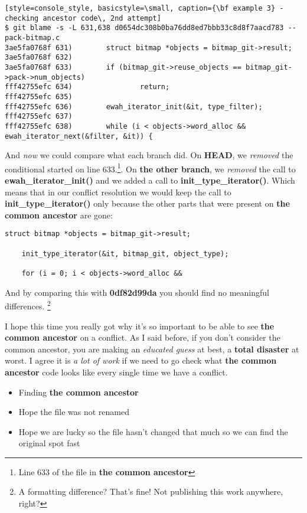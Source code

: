 \begin{lstlisting}[style=console_style, basicstyle=\small, caption={\bf example 3} - checking ancestor code\, 2nd attempt]
$ git blame -s -L 631,638 d0654dc308b0ba76dd8ed7bbb33c8d8f7aacd783 -- pack-bitmap.c
3ae5fa0768f 631)        struct bitmap *objects = bitmap_git->result;
3ae5fa0768f 632) 
3ae5fa0768f 633)        if (bitmap_git->reuse_objects == bitmap_git->pack->num_objects)
fff42755efc 634)                return;
fff42755efc 635) 
fff42755efc 636)        ewah_iterator_init(&it, type_filter);
fff42755efc 637) 
fff42755efc 638)        while (i < objects->word_alloc && ewah_iterator_next(&filter, &it)) {
\end{lstlisting}

And {\it now} we could compare what each branch did. On {\bf HEAD}, we {\it removed} the conditional started on
line 633.\footnote{Line 633 of the file in {\bf the common ancestor}}. On {\bf the other branch}, we {\it removed} the call
to {\bf ewah\_iterator\_init()} and we added a call to {\bf init\_type\_iterator()}. Which means that in our conflict resolution
we would keep the call to {\bf init\_type\_iterator()} only because the other parts that were present on {\bf the common ancestor}
are gone:

\begin{lstlisting}[style=c_style, firstnumber=671, caption={\bf example 3} - final resolution]
	struct bitmap *objects = bitmap_git->result;

	init_type_iterator(&it, bitmap_git, object_type);

	for (i = 0; i < objects->word_alloc &&
\end{lstlisting}

And by comparing this with {\bf 0df82d99da} you should find no meaningful differences. \footnote{A formatting difference? That's fine! Not publishing this work anywhere, right?}

I hope this time you really got why it's so important to be able to see {\bf the common ancestor} on a conflict. As I said before, if you
don't consider the common ancestor, you are making an {\it educated guess} at best, a {\bf total disaster} at worst. I agree it
is {\it a lot of work} if we need to go check what {\bf the common ancestor} code looks like every single time we have a conflict.
\begin{itemize}
	\item Finding {\bf the common ancestor}
	\item Hope the file was not renamed
	\item Hope we are lucky so the file hasn't changed that much so we can find the original spot fast
\end{itemize}

